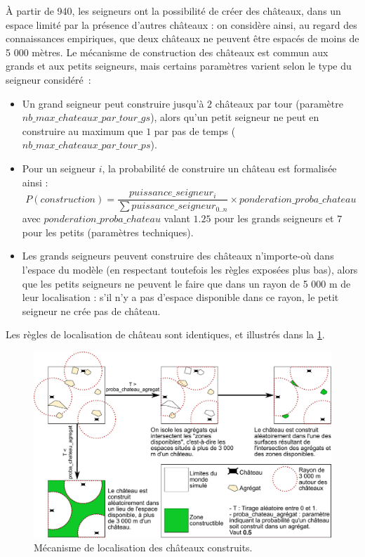 À partir de 940, les seigneurs ont la possibilité de créer des châteaux, dans un espace limité par la présence d'autres châteaux : on considère ainsi, au regard des connaissances empiriques, que deux châteaux ne peuvent être espacés de moins de 5 000 mètres.
Le mécanisme de construction des châteaux est commun aux grands et aux petits seigneurs, mais certains paramètres varient selon le type du seigneur considéré :
\begin{itemize}
	\item Un grand seigneur peut construire jusqu'à $2$ châteaux par tour (paramètre $nb\_max\_chateaux\_par\_tour\_gs$), alors qu'un petit seigneur ne peut en construire au maximum que $1$ par pas de temps ($nb\_max\_chateaux\_par\_tour\_ps$).
	\item Pour un seigneur $i$, la probabilité de construire un château est formalisée ainsi :\\
	$$ P \left( construction \right) =  \frac{puissance\_seigneur_{i}}{\sum{puissance\_seigneur_{0..n}}} \times ponderation\_proba\_chateau $$ avec $ponderation\_proba\_chateau$ valant $1.25$ pour les grands seigneurs et $7$ pour les petits (paramètres techniques).
	\item Les grands seigneurs peuvent construire des châteaux n'importe-où dans l'espace du modèle (en respectant toutefois les règles exposées plus bas), alors que les petits seigneurs ne peuvent le faire que dans un rayon de 5 000 m de leur localisation : s'il n'y a pas d'espace disponible dans ce rayon, le petit seigneur ne crée pas de château.
\end{itemize}

Les règles de localisation de château sont identiques, et illustrés dans la \cref{fig:construction-chateaux}.

\begin{figure}[H]
	\centering
	\includegraphics[width=\linewidth]{img/construction_chateaux.pdf}
	\caption{Mécanisme de localisation des châteaux construits.}
	\label{fig:construction-chateaux}
\end{figure}

